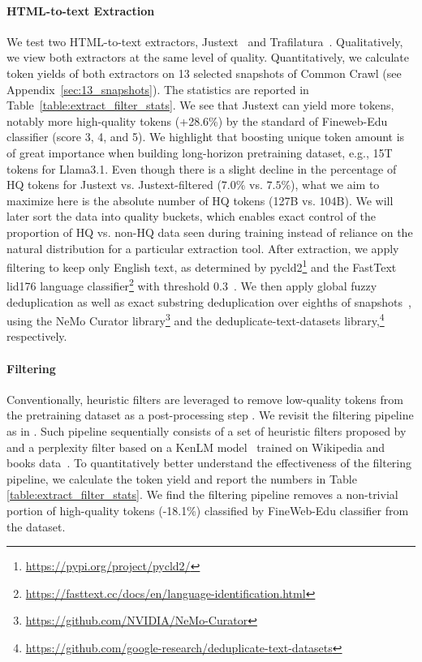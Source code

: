 \documentclass[11pt]{article}
\begin{document}
\paragraph{HTML-to-text Extraction} We test two HTML-to-text extractors, Justext~\citep{pomikalek2011removing} and Trafilatura~\citep{barbaresi-2021-trafilatura}. Qualitatively, we view both extractors at the same level of quality. Quantitatively, we calculate token yields of both extractors on 13 selected snapshots of Common Crawl (see Appendix~\ref{sec:13_snapshots}). The statistics are reported in Table~\ref{table:extract_filter_stats}. We see that Justext can yield more tokens, notably more high-quality tokens (+28.6\%) by the standard of Fineweb-Edu classifier (score 3, 4, and 5). We highlight that boosting unique token amount is of great importance when building long-horizon pretraining dataset, e.g., 15T tokens for Llama3.1. Even though there is a slight decline in the percentage of HQ tokens for Justext vs. Justext-filtered ($7.0\%$ vs. $7.5\%$), what we aim to maximize here is the absolute number of HQ tokens (127B vs. 104B). We will later sort the data into quality buckets, which enables exact control of the proportion of HQ vs. non-HQ data seen during training instead of reliance on the natural distribution for a particular extraction tool.
After extraction, we apply filtering to keep only English text, as determined by pycld2\footnote{\url{https://pypi.org/project/pycld2/}} and the FastText lid176 language classifier\footnote{\url{https://fasttext.cc/docs/en/language-identification.html}} with threshold 0.3~\citep{joulin2016fasttext,joulin2016bag}.
We then apply global fuzzy deduplication as well as exact substring deduplication over eighths of snapshots~\citep{lee2022deduplicating}, using the NeMo Curator library\footnote{\url{https://github.com/NVIDIA/NeMo-Curator}} and the deduplicate-text-datasets library,\footnote{\url{https://github.com/google-research/deduplicate-text-datasets}} respectively.

\paragraph{Filtering} Conventionally, heuristic filters are leveraged to remove low-quality tokens from the pretraining dataset as a post-processing step \citep{li2024datacomp,parmar2024data,penedo2024fineweb,dubey2024llama}. We revisit the filtering pipeline as in \citep{parmar2024data}. Such pipeline sequentially consists of a set of heuristic filters proposed by \citet{raffel2020exploring,rae2021scaling} and a perplexity filter based on a KenLM model~\citep{heafield2011kenlm} trained on Wikipedia and books data~\citep{wenzek-etal-2020-ccnet}. To quantitatively better understand the effectiveness of the filtering pipeline, we calculate the token yield and report the numbers in Table \ref{table:extract_filter_stats}. We find the filtering pipeline removes a non-trivial portion of high-quality tokens (-18.1\%) classified by FineWeb-Edu classifier from the dataset. 
\end{document}
